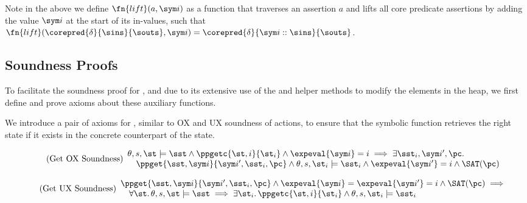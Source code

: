 Note in the above we define $\fn{lift}(a,\sym i)$ as a function that traverses an assertion $a$ and lifts all core predicate assertions by adding the value $\sym i$ at the start of its in-values, such that $\fn{lift}(\corepred{\delta}{\sins}{\souts}, \sym i)=\corepred{\delta}{\sym i::\sins}{\souts}$.

\subsection{Soundness Proofs}

To facilitate the soundness proof for \PMap, and due to its extensive use of the  and  helper methods to modify the elements in the heap, we first define and prove axioms about these auxiliary functions.

We introduce a pair of axioms for , similar to OX and UX soundness of actions, to ensure that the symbolic function retrieves the right state if it exists in the concrete counterpart of the state. 

\begin{equation}
\tag{Get OX Soundness}\label{eq:get-complete}
\begin{array}{l}
\theta,s,\st \models \sst \land \ppgetc{\st, i}{\st_i} \land \expeval{\sym i}=i \implies \exists \sst_i, \sym i', \pc \ldotp \\
\quad \ppget{\sst,\sym i}{\sym i', \sst_i, \pc} \land \theta,s,\st_i\models\sst_i \land \expeval{\sym i'}=i \land \SAT(\pc)
\end{array}
\end{equation}

\begin{equation}
\tag{Get UX Soundness}\label{eq:get-sound}
\begin{array}{l}
\ppget{\sst,\sym i}{\sym i', \sst_i, \pc} \land \expeval{\sym i}=\expeval{\sym i'}=i \land \SAT(\pc) \implies \\
\quad \forall \st\ldotp \theta,s,\st \models \sst \implies \exists \st_i \ldotp \ppgetc{\st, i}{\st_i} \land \theta,s,\st_i \models \sst_i
\end{array}
\end{equation}


